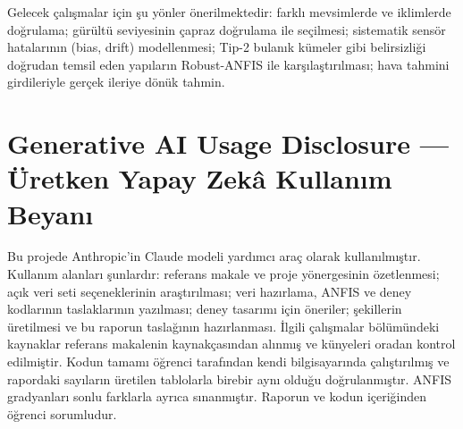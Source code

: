 \documentclass[11pt,a4paper]{article}
\begin{document}
Gelecek çalışmalar için şu yönler önerilmektedir: farklı mevsimlerde ve iklimlerde doğrulama; gürültü seviyesinin çapraz doğrulama ile seçilmesi; sistematik sensör hatalarının (bias, drift) modellenmesi; Tip-2 bulanık kümeler gibi belirsizliği doğrudan temsil eden yapıların Robust-ANFIS ile karşılaştırılması; hava tahmini girdileriyle gerçek ileriye dönük tahmin.

\section*{Generative AI Usage Disclosure — Üretken Yapay Zekâ Kullanım Beyanı}
Bu projede Anthropic'in Claude modeli yardımcı araç olarak kullanılmıştır. Kullanım alanları şunlardır: referans makale ve proje yönergesinin özetlenmesi; açık veri seti seçeneklerinin araştırılması; veri hazırlama, ANFIS ve deney kodlarının taslaklarının yazılması; deney tasarımı için öneriler; şekillerin üretilmesi ve bu raporun taslağının hazırlanması. İlgili çalışmalar bölümündeki kaynaklar referans makalenin kaynakçasından alınmış ve künyeleri oradan kontrol edilmiştir. Kodun tamamı öğrenci tarafından kendi bilgisayarında çalıştırılmış ve rapordaki sayıların üretilen tablolarla birebir aynı olduğu doğrulanmıştır. ANFIS gradyanları sonlu farklarla ayrıca sınanmıştır. Raporun ve kodun içeriğinden öğrenci sorumludur.
\end{document}

